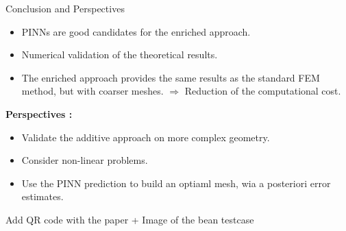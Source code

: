 \begin{frame}[label={lastslide}]{Conclusion and Perspectives}
	\begin{itemize}
		\item PINNs are good candidates for the enriched approach.
		\item Numerical validation of the theoretical results.
		\item The enriched approach provides the same results as the standard FEM method, but with coarser meshes.
		$\Rightarrow$ Reduction of the computational cost.
	\end{itemize}

	\textbf{Perspectives :}

	\begin{itemize}
		\item Validate the additive approach on more complex geometry.
		\item Consider non-linear problems.
		\item Use the PINN prediction to build an optiaml mesh, wia a posteriori error estimates.
	\end{itemize}

	Add QR code with the paper + Image of the bean testcase
\end{frame}

